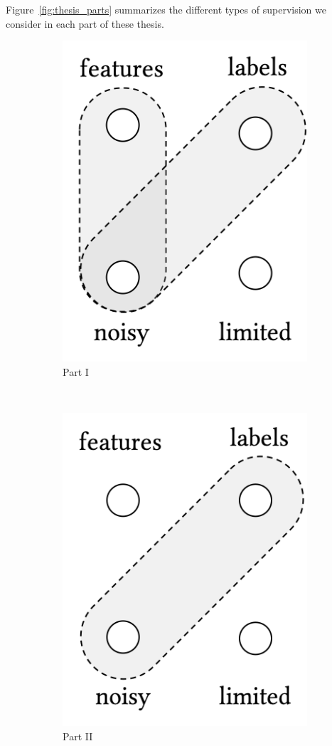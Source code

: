 Figure~\ref{fig:thesis_parts} summarizes the different types of supervision we consider in each part of these thesis.
\begin{figure}[t]
    \centering
    \begin{subfigure}[b]{0.32\textwidth}
    \centering
        \includegraphics[width=0.55\linewidth]{01-introduction/figs_and_tables/fig_p1.png}
        \caption{\label{fig:p1}Part I}
    \end{subfigure}
        ~ 
    \begin{subfigure}[b]{0.32\textwidth}
    \centering
        \includegraphics[width=0.55\linewidth]{01-introduction/figs_and_tables/fig_p2.png}
        \caption{\label{fig:p1}Part II}
    \end{subfigure}
        ~ 
    \begin{subfigure}[b]{0.32\textwidth}

\end{subfigure}
\end{figure}
